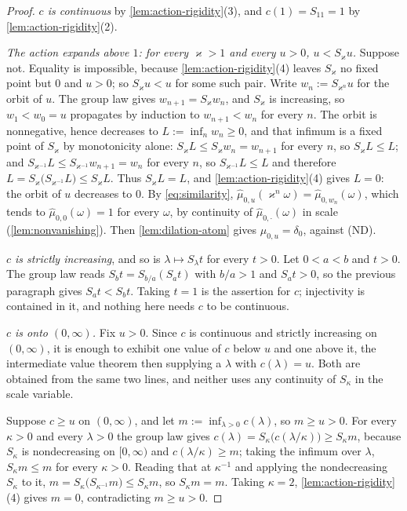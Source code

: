 \begin{proof}
\leanok
\emph{$c$ is continuous} by \ref{lem:action-rigidity}(3), and $c(1) = S_11 = 1$ by
\ref{lem:action-rigidity}(2).

\emph{The action expands above $1$: for every $\varkappa > 1$ and every $u > 0$,
$u < S_\varkappa u$.} Suppose not. Equality is impossible, because
\ref{lem:action-rigidity}(4) leaves $S_\varkappa$ no fixed point but $0$ and $u > 0$; so
$S_\varkappa u < u$ for some such pair. Write $w_n := S_{\varkappa^n}u$ for the orbit of $u$.
The group law gives $w_{n+1} = S_\varkappa w_n$, and $S_\varkappa$ is increasing, so
$w_1 < w_0 = u$ propagates by induction to $w_{n+1} < w_n$ for every $n$. The orbit is
nonnegative, hence decreases to $L := \inf_n w_n \ge 0$, and that infimum is a fixed point of
$S_\varkappa$ by monotonicity alone: $S_\varkappa L \le S_\varkappa w_n = w_{n+1}$ for every
$n$, so $S_\varkappa L \le L$; and $S_{\varkappa^{-1}}L \le S_{\varkappa^{-1}}w_{n+1} = w_n$
for every $n$, so $S_{\varkappa^{-1}}L \le L$ and therefore
$L = S_\varkappa\bigl(S_{\varkappa^{-1}}L\bigr) \le S_\varkappa L$. Thus $S_\varkappa L = L$,
and \ref{lem:action-rigidity}(4) gives $L = 0$: the orbit of $u$ decreases to $0$. By
\ref{eq:similarity}, $\hat\mu_{0,u}(\varkappa^n\omega) = \hat\mu_{0,w_n}(\omega)$, which tends
to $\hat\mu_{0,0}(\omega) = 1$ for every $\omega$, by continuity of
$\hat\mu_{0,\cdot}(\omega)$ in scale (\ref{lem:nonvanishing}). Then \ref{lem:dilation-atom}
gives $\mu_{0,u} = \delta_0$, against (ND).

\emph{$c$ is strictly increasing}, and so is $\lambda \mapsto S_\lambda t$ for every $t > 0$.
Let $0 < a < b$ and $t > 0$. The group law reads $S_b t = S_{b/a}(S_a t)$ with $b/a > 1$ and
$S_a t > 0$, so the previous paragraph gives $S_a t < S_b t$. Taking $t = 1$ is the assertion
for $c$; injectivity is contained in it, and nothing here needs $c$ to be continuous.

\emph{$c$ is onto $(0,\infty)$.} Fix $u > 0$. Since $c$ is continuous and strictly increasing on
$(0,\infty)$, it is enough to exhibit one value of $c$ below $u$ and one above it, the
intermediate value theorem then supplying a $\lambda$ with $c(\lambda) = u$. Both are obtained
from the same two lines, and neither uses any continuity of $S_\kappa$ in the scale variable.

Suppose $c \ge u$ on $(0,\infty)$, and let $m := \inf_{\lambda > 0} c(\lambda)$, so
$m \ge u > 0$. For every $\kappa > 0$ and every $\lambda > 0$ the group law gives
$c(\lambda) = S_\kappa\bigl(c(\lambda/\kappa)\bigr) \ge S_\kappa m$, because $S_\kappa$ is
nondecreasing on $[0,\infty)$ and $c(\lambda/\kappa) \ge m$; taking the infimum over $\lambda$,
$S_\kappa m \le m$ for every $\kappa > 0$. Reading that at $\kappa^{-1}$ and applying the
nondecreasing $S_\kappa$ to it, $m = S_\kappa\bigl(S_{\kappa^{-1}}m\bigr) \le S_\kappa m$, so
$S_\kappa m = m$. Taking $\kappa = 2$, \ref{lem:action-rigidity}(4) gives $m = 0$, contradicting
$m \ge u > 0$.


\end{proof}

